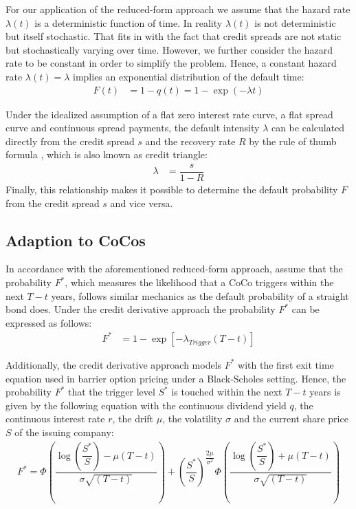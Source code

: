 For our application of the reduced-form approach we assume that the hazard rate $\lambda(t)$ is a deterministic function of time. In reality $\lambda(t)$ is not deterministic but itself stochastic. That fits in with the fact that credit spreads are not static but stochastically varying over time. \citep{lectureschmidt} However, we further consider the hazard rate to be constant in order to simplify the problem. Hence, a constant hazard rate $\lambda(t) = \lambda$ implies an exponential distribution of the default time:
\begin{align} \label{bonddefaultprob}
F(t) &=  1 - q(t) = 1 - \exp (- \lambda t)
\end{align}

Under the idealized assumption of a flat zero interest rate curve, a flat spread curve and continuous spread payments, the default intensity $\lambda$ can be calculated directly from the credit spread $s$ and the recovery rate $R$ by the rule of thumb formula \citep{lectureschmidt}, which is also known as credit triangle: 
\begin{align}
\lambda &= \dfrac{s}{1 - R}
\end{align}
Finally, this relationship makes it possible to determine the default probability $F$ from the credit spread $s$ and vice versa.

\subsection{Adaption to CoCos}
In accordance with the aforementioned reduced-form approach, \citet{de2011pricing} assume that the probability $F^*$, which measures the likelihood that a CoCo triggers within the next $T - t$ years, follows similar mechanics as the default probability of a straight bond does. Under the credit derivative approach the probability $F^*$ can be expressed as follows:
\begin{align} \label{cocodefaultprob}
    F^* &= 1 - \exp\left[- \lambda_{Trigger} (T-t)\right]
\end{align}

Additionally, the credit derivative approach models $F^*$ with the first exit time equation used in barrier option pricing under a Black-Scholes setting. \citep{su2009likely} Hence, the probability $F^*$ that the trigger level $S^*$ is touched within the next $T - t$ years is given by the following equation with the continuous dividend yield $q$, the continuous interest rate $r$, the drift $\mu$, the volatility $\sigma$ and the current share price $S$ of the issuing company: 
\begin{align}
    F^* = \Phi\left( \dfrac{\log \left(\dfrac{S^*}{S}\right) - \mu (T - t)}{\sigma \sqrt{(T - t)}}\right) + \left(\dfrac{S^*}{S}\right)^{\dfrac{2 \mu}{\sigma^2}} \Phi\left( \dfrac{\log \left(\dfrac{S^*}{S}\right) + \mu (T - t)}{\sigma \sqrt{(T - t)}}\right)
\end{align}

